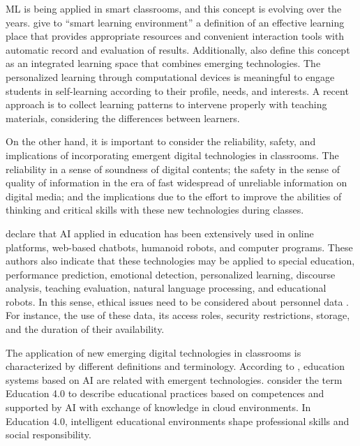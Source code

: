 \documentclass[english]{textolivre}
\begin{document}
ML is being applied in smart classrooms, and this concept is evolving
over the years. \textcite{Yang2021} give to ``smart learning
environment'' a definition of an effective learning place that provides
appropriate resources and convenient interaction tools with automatic
record and evaluation of results. Additionally, \textcite{Dimitriadou2022} also define this concept as an integrated learning space that
combines emerging technologies. The personalized learning through
computational devices is meaningful to engage students in self-learning
according to their profile, needs, and interests. A recent approach
\cite{Luan2021} is to collect learning patterns to intervene properly
with teaching materials, considering the differences between learners.

On the other hand, it is important to consider the reliability, safety,
and implications of incorporating emergent digital technologies in
classrooms. The reliability in a sense of soundness of digital contents;
the safety in the sense of quality of information in the era of fast
widespread of unreliable information on digital media; and the
implications due to the effort to improve the abilities of thinking and
critical skills with these new technologies during classes.

\textcite{Chen2021} declare that AI applied in education has been
extensively used in online platforms, web-based chatbots, humanoid
robots, and computer programs. These authors also indicate that these
technologies may be applied to special education, performance
prediction, emotional detection, personalized learning, discourse
analysis, teaching evaluation, natural language processing, and
educational robots. In this sense, ethical issues need to be considered
about personnel data \cite{Pelletier2021}. For instance, the use of
these data, its access roles, security restrictions, storage, and the
duration of their availability.

The application of new emerging digital technologies in classrooms is
characterized by different definitions and terminology. According to
\textcite{Wang2023}, education systems based on AI are related with
emergent technologies. \textcite{ChamorroAtalaya2023} consider the term
Education 4.0 to describe educational practices based on competences and
supported by AI with exchange of knowledge in cloud environments. In
Education 4.0, intelligent educational environments shape professional
skills and social responsibility.
\end{document}
